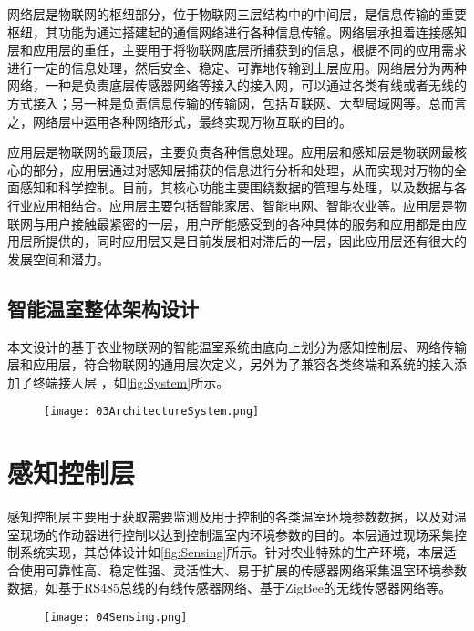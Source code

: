 网络层是物联网的枢纽部分，位于物联网三层结构中的中间层，是信息传输的重要枢纽，其功能为通过搭建起的通信网络进行各种信息传输。网络层承担着连接感知层和应用层的重任，主要用于将物联网底层所捕获到的信息，根据不同的应用需求进行一定的信息处理，然后安全、稳定、可靠地传输到上层应用。网络层分为两种网络，一种是负责底层传感器网络等接入的接入网，可以通过各类有线或者无线的方式接入；另一种是负责信息传输的传输网，包括互联网、大型局域网等。总而言之，网络层中运用各种网络形式，最终实现万物互联的目的。

应用层是物联网的最顶层，主要负责各种信息处理。应用层和感知层是物联网最核心的部分，应用层通过对感知层捕获的信息进行分析和处理，从而实现对万物的全面感知和科学控制。目前，其核心功能主要围绕数据的管理与处理，以及数据与各行业应用相结合。应用层主要包括智能家居、智能电网、智能农业等。应用层是物联网与用户接触最紧密的一层，用户所能感受到的各种具体的服务和应用都是由应用层所提供的，同时应用层又是目前发展相对滞后的一层，因此应用层还有很大的发展空间和潜力。

	
	\subsection{智能温室整体架构设计}
本文设计的基于农业物联网的智能温室系统由底向上划分为感知控制层、网络传输层和应用层，符合物联网的通用层次定义，另外为了兼容各类终端和系统的接入添加了终端接入层\supercite{WangHuaiyu2015} ，如\ref{fig:System}所示。	
	\begin{figure}[!htp]
		\centering
		\texttt{[image: 03ArchitectureSystem.png]}
	\end{figure}	
\section{感知控制层}
感知控制层主要用于获取需要监测及用于控制的各类温室环境参数数据，以及对温室现场的作动器进行控制以达到控制温室内环境参数的目的。本层通过现场采集控制系统实现，其总体设计如\ref{fig:Sensing}所示。针对农业特殊的生产环境，本层适合使用可靠性高、稳定性强、灵活性大、易于扩展的传感器网络采集温室环境参数数据，如基于RS485总线的有线传感器网络、基于ZigBee的无线传感器网络等。
	\begin{figure}[!htp]
		\centering
		\texttt{[image: 04Sensing.png]}
	\end{figure}

